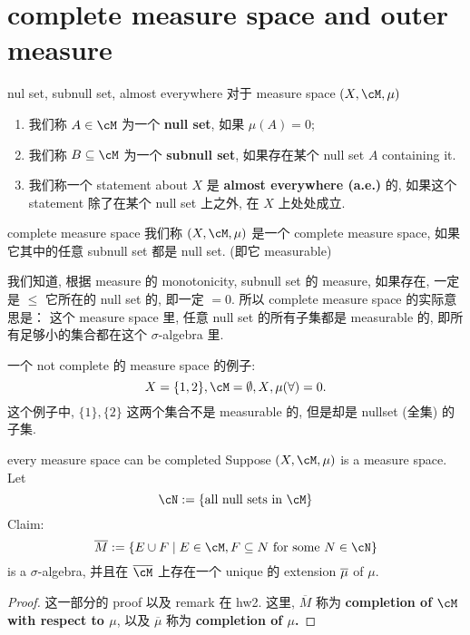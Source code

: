 \documentclass[lang=cn,11pt]{elegantbook}
\begin{document}
\chapter{complete measure space and outer measure}

\begin{definition}{nul set, subnull set, almost everywhere}
对于 measure space $(X, \cM, \mu)$
\begin{enumerate}
    \item 我们称 $A \in \cM$ 为一个 \textbf{null set}, 如果 $\mu(A) = 0$;
    \item 我们称 $B \sub \cM$ 为一个 \textbf{subnull set}, 如果存在某个 null set $A$ containing it.
    \item 我们称一个 statement about $X$ 是 \textbf{almost everywhere (a.e.)} 的, 如果这个 statement 除了在某个 null set 上之外, 在 $X$ 上处处成立.
\end{enumerate}
\end{definition}


\begin{definition}{complete measure space}
    我们称 $(X,\cM, \mu)$ 是一个 complete measure space, 如果它其中的任意 subnull set 都是 null set. (即它 measurable)
\end{definition}
\begin{remark}
    我们知道, 根据 measure 的 monotonicity, subnull set 的 measure, 如果存在, 一定是 $\leq$ 它所在的 null set 的, 即一定 $=0$. 所以 complete measure space 的实际意思是： 这个 measure space 里, 任意 null set 的所有子集都是 measurable 的, 即所有足够小的集合都在这个 $\sigma$-algebra 里.
\end{remark}




\begin{example} 一个 not complete 的 measure space 的例子:
$$
X = \{1,2\}, \cM = {\emptyset, X}, \mu(\forall) = 0.
$$
这个例子中, $\{1\}, \{2\}$ 这两个集合不是 measurable 的, 但是却是 nullset (全集) 的子集.
\end{example}



\begin{theorem}{every measure space can be completed}
    Suppose $(X, \cM,\mu)$ is a measure space.\\
    Let 
    \[
    \cN := \{\text{all null sets in }   \cM \}
    \]
    Claim:
    \[
    \ol{M}  := \{   E\cup F \mid E \in \cM, F \sub N \text{ for some } N \in \cN \}
    \]
    is a $\sigma$-algebra, 并且在 $\ol{\cM}$ 上存在一个 unique 的 extension $\overline{\mu}$ of $\mu$.
\end{theorem}
\begin{proof}
    这一部分的 proof 以及 remark 在 hw2. 这里, $\overline{M}$ 称为 \textbf{completion of $\cM$ with respect to $\mu$}, 以及 $\overline{\mu}$ 称为 \textbf{completion of $\mu$.}
\end{proof}
\end{document}
